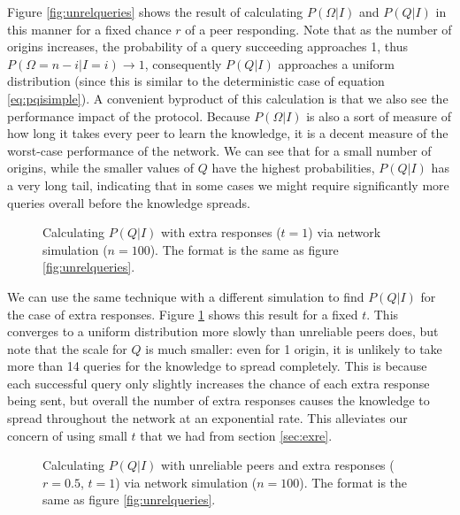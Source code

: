 \documentclass{article}
\newcommand{\eqnref}[1]{equation \eqref{eq:#1}}
\newcommand{\secref}[1]{section \ref{sec:#1}}
\newcommand{\figref}[1]{figure \ref{fig:#1}}
\newcommand{\Figref}[1]{Figure \ref{fig:#1}}
\begin{document}
\Figref{unrelqueries} shows the result of
calculating $P(\Omega|I)$ and $P(Q|I)$ in this manner for a fixed chance $r$ of
a peer responding. Note that as the number of origins increases, the probability
of a query succeeding approaches 1, thus $P(\Omega=n-i|I=i)\rightarrow 1$,
consequently $P(Q|I)$ approaches a uniform distribution (since this is similar
to the deterministic case of \eqnref{pqisimple}). A convenient byproduct of this
calculation is that we also see the performance impact of the protocol.
Because $P(\Omega|I)$ is also a sort of measure of how long it takes every peer
to learn the knowledge, it is a decent measure of the worst-case performance of
the network. We can see that for a small number of origins, while the smaller
values of $Q$ have the highest probabilities, $P(Q|I)$ has a very long tail,
indicating that in some cases we might require significantly more queries
overall before the knowledge spreads.

\begin{figure}%
    \centering
	\caption{Calculating $P(Q|I)$ with extra responses ($t=1$) via network
	simulation ($n=100$). The format is the same as \figref{unrelqueries}.}
    \label{fig:exrequeries}%
\end{figure}

We can use the same technique with a different simulation to find $P(Q|I)$ for
the case of extra responses. \Figref{exrequeries} shows this result for a fixed $t$.
This converges to a uniform distribution more slowly than unreliable peers does,
but note that the scale for $Q$ is much smaller: even for 1 origin, it is
unlikely to take more than 14 queries for the knowledge to spread completely.
This is because each successful query only slightly increases the chance of each
extra response being sent, but overall the number of extra responses causes the
knowledge to spread throughout the network at an exponential rate. This
alleviates our concern of using small $t$ that we had from \secref{exre}.

\begin{figure}%
    \centering
	\caption{Calculating $P(Q|I)$ with unreliable peers and extra responses
	($r=0.5$, $t=1$) via network simulation ($n=100$). The format is the same
	as \figref{unrelqueries}.}
    \label{fig:unexrequeries}%
\end{figure}
\end{document}
